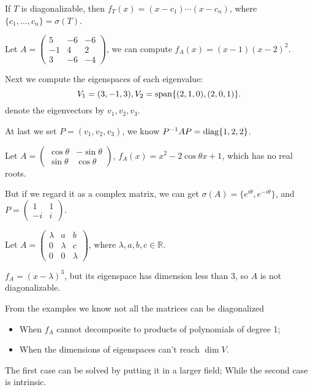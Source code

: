If $T$ is diagonalizable, then  $f_T(x)=(x-c_1)\cdots (x-c_n)$, where
$\{c_1,\dots,c_n\}=\sigma(T)$.

\begin{example}
    Let $A = \begin{pmatrix}
		5&-6&-6\\-1&4&2\\3&-6&-4
    \end{pmatrix}$, we can compute $f_A(x)=(x-1)(x-2)^2$.

	Next we compute the eigenspaces of each eigenvalue:
	 \[
	V_1=(3,-1,3), V_2=\operatorname{span}\{(2,1,0),(2,0,1)\}.
	\]
	denote the eigenvectors by $v_1,v_2,v_3$.

	At last we set $P=(v_1,v_2,v_3)$, we know $P^{-1}AP=\operatorname{diag}\{1,2,2\}$.
\end{example}
\begin{example}
    Let $A=\begin{pmatrix}
		\cos \theta &-\sin \theta \\ \sin\theta &\cos\theta
    \end{pmatrix}$, $f_A(x)=x^2-2\cos\theta x + 1$, which has no real roots.

	But if we regard it as a complex matrix, we can get
	$\sigma(A)=\{e^{i\theta}, e^{-i\theta}\}$,
	and $P = \begin{pmatrix}
		1&1\\-i&i
	\end{pmatrix}$.
\end{example}
\begin{example}
    Let $A=\begin{pmatrix}
		\lambda &a &b\\0&\lambda&c\\0&0&\lambda
    \end{pmatrix}$, where $\lambda,a,b,c\in \mathbb{R}$.

	$f_A=(x-\lambda)^3$, but its eigenspace has dimension less than $3$,
	so $A$ is not diagonalizable.
\end{example}

From the examples we know not all the matrices can be diagonalized
\begin{itemize}
	\item When $f_A$ cannot decomposite to products of polynomials of degree 1;
	\item When the dimensions of eigenspaces can't reach $\dim V$.
\end{itemize}
The first case can be solved by putting it in a larger field;
While the second case is intrinsic.

